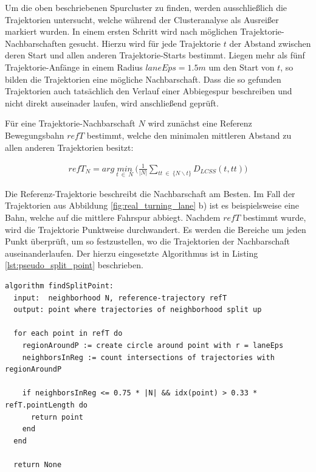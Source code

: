 Um die oben beschriebenen Spurcluster zu finden, werden ausschließlich die Trajektorien untersucht,
welche während der Clusteranalyse als Ausreißer markiert wurden.
In einem ersten Schritt wird nach möglichen Trajektorie-Nachbarschaften gesucht. Hierzu wird für
jede Trajektorie $t$ der Abstand zwischen deren Start und allen anderen Trajektorie-Starts bestimmt.
Liegen mehr als fünf Trajektorie-Anfänge in einem Radius $laneEps = 1.5m$ um den Start von $t$, so bilden
die Trajektorien eine mögliche Nachbarschaft.
Dass die so gefunden Trajektorien auch tatsächlich den Verlauf einer Abbiegespur beschreiben und nicht
direkt auseinader laufen, wird anschließend geprüft.

Für eine Trajektorie-Nachbarschaft $N$ wird zunächst eine Referenz Bewegungsbahn $refT$ bestimmt, welche den
minimalen mittleren Abstand zu allen anderen Trajektorien besitzt:

\begin{ceqn}
\begin{align}
    refT_N = arg\ \underset{t\ \in\ N}{min}\ \Big(\frac{1}{|N|} \sum_{tt\ \in\ \{N \backslash t\}} D_{LCSS}(t, tt) \Big)
\end{align}
\end{ceqn}

Die Referenz-Trajektorie beschreibt die Nachbarschaft am Besten. Im Fall der Trajektorien aus Abbildung
\ref{fig:real_turning_lane} b) ist es beispielsweise eine Bahn, welche auf die mittlere Fahrspur abbiegt.
Nachdem $refT$ bestimmt wurde, wird die Trajektorie Punktweise durchwandert. Es werden die Bereiche um jeden
Punkt überprüft, um so festzustellen, wo die Trajektorien der Nachbarschaft auseinanderlaufen. Der hierzu
eingesetzte Algorithmus ist in Listing \ref{lst:pseudo_split_point} beschrieben.
\begin{lstlisting}[caption=Pseudocode Split-Punkt Bestimmung, language=Pseudo, label=lst:pseudo_split_point]
algorithm findSplitPoint:
  input:  neighborhood N, reference-trajectory refT
  output: point where trajectories of neighborhood split up

  for each point in refT do
    regionAroundP := create circle around point with r = laneEps
    neighborsInReg := count intersections of trajectories with regionAroundP

    if neighborsInReg <= 0.75 * |N| && idx(point) > 0.33 * refT.pointLength do
      return point
    end
  end

  return None
\end{lstlisting}

